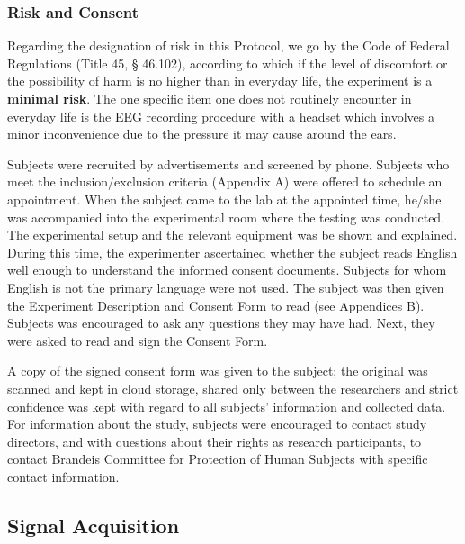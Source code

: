 \documentclass[journal]{IEEEtran}
\begin{document}
\subsubsection{Risk and Consent}
Regarding the designation of risk in this Protocol, we go by the Code of Federal Regulations (Title 45, § 46.102), according to which if the level of discomfort or the possibility of harm is no higher than in everyday life, the experiment is a \textbf{minimal risk}. The one specific item one does not routinely encounter in everyday life is the EEG recording procedure with a headset which involves a minor inconvenience due to the pressure it may cause around the ears. \par
Subjects were recruited by advertisements and screened by phone. Subjects who meet the inclusion/exclusion criteria (Appendix A) were offered to schedule an appointment. When the subject came to the lab at the appointed time, he/she was accompanied into the experimental room where the testing was conducted. The experimental setup and the relevant equipment was be shown and explained. During this time, the experimenter ascertained whether the subject reads English well enough to understand the informed consent documents. Subjects for whom English is not the primary language were not used. The subject was then given the Experiment Description and Consent Form to read (see Appendices B). Subjects was encouraged to ask any questions they may have had.  Next, they were asked to read and sign the Consent Form. \par  A copy of the signed consent form was given to the subject; the original was scanned and kept in cloud storage, shared only between the researchers and strict confidence was kept with regard to all subjects’ information and collected data.
For information about the study, subjects were encouraged to contact study directors, and with questions about their rights as research participants, to contact Brandeis Committee for Protection of Human Subjects with specific contact information.   

\subsection{Signal Acquisition}
\end{document}
